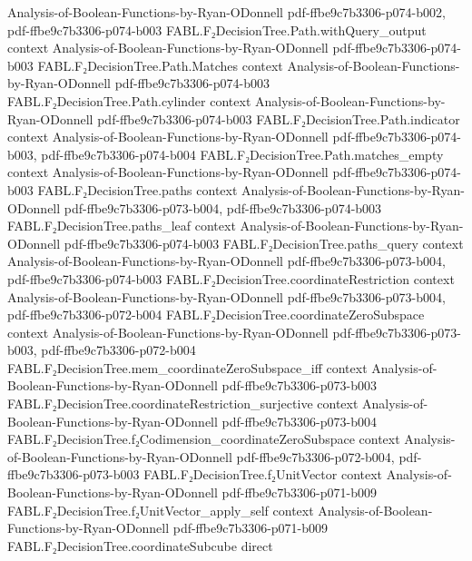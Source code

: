 \begin{theorem}
  {Analysis-of-Boolean-Functions-by-Ryan-ODonnell}
  {pdf-ffbe9c7b3306-p074-b002,
    pdf-ffbe9c7b3306-p074-b003}
\proofstep
  {FABL.F₂DecisionTree.Path.withQuery_output}
  {context}
  {Analysis-of-Boolean-Functions-by-Ryan-ODonnell}
  {pdf-ffbe9c7b3306-p074-b003}
\proofstep
  {FABL.F₂DecisionTree.Path.Matches}
  {context}
  {Analysis-of-Boolean-Functions-by-Ryan-ODonnell}
  {pdf-ffbe9c7b3306-p074-b003}
\proofstep
  {FABL.F₂DecisionTree.Path.cylinder}
  {context}
  {Analysis-of-Boolean-Functions-by-Ryan-ODonnell}
  {pdf-ffbe9c7b3306-p074-b003}
\proofstep
  {FABL.F₂DecisionTree.Path.indicator}
  {context}
  {Analysis-of-Boolean-Functions-by-Ryan-ODonnell}
  {pdf-ffbe9c7b3306-p074-b003,
    pdf-ffbe9c7b3306-p074-b004}
\proofstep
  {FABL.F₂DecisionTree.Path.matches_empty}
  {context}
  {Analysis-of-Boolean-Functions-by-Ryan-ODonnell}
  {pdf-ffbe9c7b3306-p074-b003}
\proofstep
  {FABL.F₂DecisionTree.paths}
  {context}
  {Analysis-of-Boolean-Functions-by-Ryan-ODonnell}
  {pdf-ffbe9c7b3306-p073-b004,
    pdf-ffbe9c7b3306-p074-b003}
\proofstep
  {FABL.F₂DecisionTree.paths_leaf}
  {context}
  {Analysis-of-Boolean-Functions-by-Ryan-ODonnell}
  {pdf-ffbe9c7b3306-p074-b003}
\proofstep
  {FABL.F₂DecisionTree.paths_query}
  {context}
  {Analysis-of-Boolean-Functions-by-Ryan-ODonnell}
  {pdf-ffbe9c7b3306-p073-b004,
    pdf-ffbe9c7b3306-p074-b003}
\proofstep
  {FABL.F₂DecisionTree.coordinateRestriction}
  {context}
  {Analysis-of-Boolean-Functions-by-Ryan-ODonnell}
  {pdf-ffbe9c7b3306-p073-b004,
    pdf-ffbe9c7b3306-p072-b004}
\proofstep
  {FABL.F₂DecisionTree.coordinateZeroSubspace}
  {context}
  {Analysis-of-Boolean-Functions-by-Ryan-ODonnell}
  {pdf-ffbe9c7b3306-p073-b003,
    pdf-ffbe9c7b3306-p072-b004}
\proofstep
  {FABL.F₂DecisionTree.mem_coordinateZeroSubspace_iff}
  {context}
  {Analysis-of-Boolean-Functions-by-Ryan-ODonnell}
  {pdf-ffbe9c7b3306-p073-b003}
\proofstep
  {FABL.F₂DecisionTree.coordinateRestriction_surjective}
  {context}
  {Analysis-of-Boolean-Functions-by-Ryan-ODonnell}
  {pdf-ffbe9c7b3306-p073-b004}
\proofstep
  {FABL.F₂DecisionTree.f₂Codimension_coordinateZeroSubspace}
  {context}
  {Analysis-of-Boolean-Functions-by-Ryan-ODonnell}
  {pdf-ffbe9c7b3306-p072-b004,
    pdf-ffbe9c7b3306-p073-b003}
\proofstep
  {FABL.F₂DecisionTree.f₂UnitVector}
  {context}
  {Analysis-of-Boolean-Functions-by-Ryan-ODonnell}
  {pdf-ffbe9c7b3306-p071-b009}
\proofstep
  {FABL.F₂DecisionTree.f₂UnitVector_apply_self}
  {context}
  {Analysis-of-Boolean-Functions-by-Ryan-ODonnell}
  {pdf-ffbe9c7b3306-p071-b009}
\proofstep
  {FABL.F₂DecisionTree.coordinateSubcube}
  {direct}

\end{theorem}
